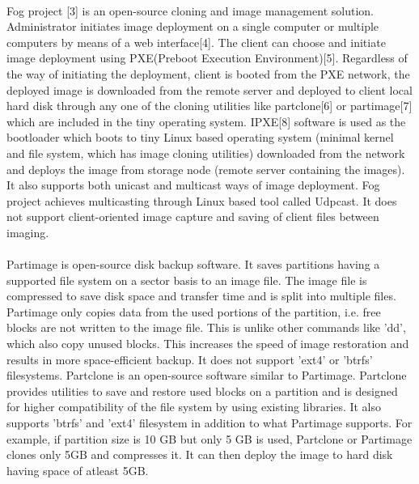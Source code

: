 \documentclass[a4paper,12pt]{article}
\begin{document}
\paragraph{}
Fog project [3] is an open-source cloning and image management solution. Administrator initiates image deployment on a single computer or multiple computers by means of a web interface[4]. The client can choose and initiate image deployment using PXE(Preboot Execution Environment)[5]. Regardless of  the way of initiating the deployment, client is booted from the PXE network, the deployed image is downloaded from the remote server and deployed to client local hard disk through any one of the cloning utilities like partclone[6] or partimage[7] which are included in the tiny operating system. IPXE[8] software is used as the bootloader which boots to tiny Linux based operating system (minimal kernel and file system, which has image cloning utilities) downloaded from the network and deploys the image from storage node (remote server containing the images). It also supports both unicast and multicast ways of image deployment. Fog project achieves multicasting through Linux based tool called Udpcast. It does not support client-oriented image capture and saving of client files between imaging.
\paragraph{}
Partimage is open-source disk backup software. It saves partitions having a supported file system on a sector basis to an image file. The image file is compressed to save disk space and transfer time and is split into multiple files. Partimage only copies data from the used portions of the partition, i.e. free blocks are not written to the image file. This is unlike other commands like 'dd', which also copy unused blocks. This increases the speed of image restoration and results in more space-efficient backup. It does not support 'ext4' or 'btrfs' filesystems.
Partclone is an open-source software similar to  Partimage. Partclone provides utilities to save and restore used blocks on a partition and is designed for higher compatibility of the file system by using existing libraries. It also supports 'btrfs' and 'ext4' filesystem in addition to what Partimage supports.
For example, if partition size is 10 GB but only 5 GB is used, Partclone or Partimage clones only 5GB and compresses it. It can then deploy the image to hard disk having space of atleast 5GB.
\end{document}
